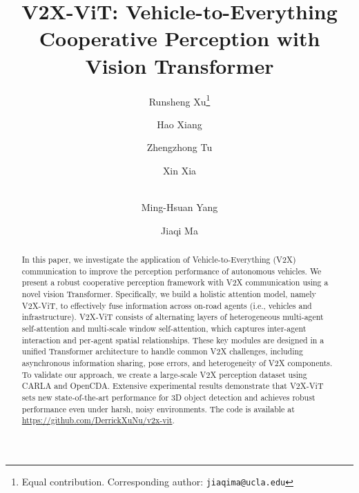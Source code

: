 \documentclass[runningheads]{llncs}
\begin{document}
\pagestyle{headings}
\mainmatter
\def\ECCVSubNumber{4589}  

\title{V2X-ViT: Vehicle-to-Everything Cooperative Perception with Vision Transformer} 

\begin{comment}
\titlerunning{ECCV-22 submission ID \ECCVSubNumber} 
\authorrunning{ECCV-22 submission ID \ECCVSubNumber} 
\author{Anonymous ECCV submission}
\institute{Paper ID \ECCVSubNumber}
\end{comment}




\author{Runsheng Xu\thanks{Equal contribution.  Corresponding author: \texttt{jiaqima@ucla.edu}} \and
Hao Xiang\and
Zhengzhong Tu\and
Xin Xia \and \\
Ming-Hsuan Yang \and
Jiaqi Ma
}

\maketitle

\begin{abstract}
In this paper, we investigate the application of Vehicle-to-Everything (V2X) communication to improve the perception performance of autonomous vehicles. We present a robust cooperative perception framework with V2X communication using a novel vision Transformer. Specifically, we build a holistic attention model, namely V2X-ViT, to effectively fuse information across on-road agents (i.e., vehicles and infrastructure). V2X-ViT consists of alternating layers of heterogeneous multi-agent self-attention and multi-scale window self-attention, which captures inter-agent interaction and per-agent spatial relationships. These key modules are designed in a unified Transformer architecture to handle common V2X challenges, including asynchronous information sharing, pose errors, and heterogeneity of V2X components. To validate our approach, we create a large-scale V2X perception dataset using CARLA and OpenCDA. Extensive experimental results demonstrate that V2X-ViT sets new state-of-the-art performance for 3D object detection and achieves robust performance even under harsh, noisy environments. The code is available at \url{https://github.com/DerrickXuNu/v2x-vit}.
\end{abstract}
\end{document}
